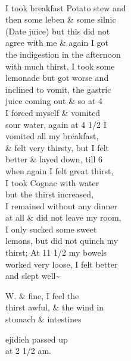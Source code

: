 \documentclass{report}
\begin{document}



	\par{
 	\ \\I took breakfast Potato stew and\ \\then some leben \& some silnic\ \\(Date juice) but this did not\ \\agree with me \& again I got\ \\the indigestion in the afternoon\ \\with much thirst, I took some\ \\lemonade but got worse and\ \\inclined to vomit, the gastric\ \\juice coming out \& so at 4\ \\I forced myself \& vomited\ \\sour water, again at 4 1/2 I\ \\vomited all my breakfast,\ \\\& felt very thirsty, but I felt\ \\better \& layed down, till 6\ \\when again I felt great thirst,\ \\I took Cognac with water\ \\but the thirst increased,\ \\I remained without any dinner\ \\at all \& did not leave my room,\ \\I only sucked some sweet\ \\lemons, but did not quinch my\ \\thirst; At 11 1/2 my bowels\ \\worked very loose, I felt better\ \\and slept well\~{}\ \\
	}


	\par{
 	W. \& fine, I feel the\ \\thirst awful, \& the wind in\ \\stomach \& intestines\ \\
	}

	\par{
 	ejidieh passed up\ \\at 2 1/2 am.\ \\
	}
\end{document}
